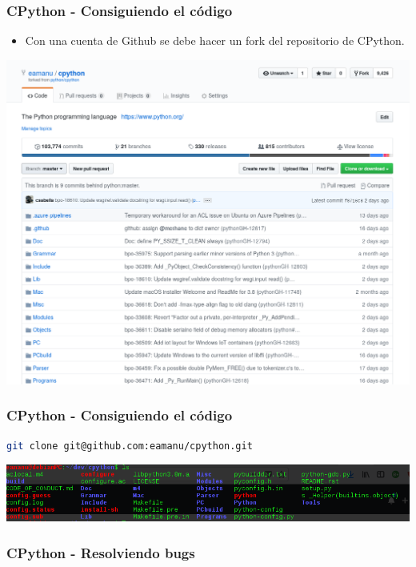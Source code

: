 \documentclass[spanish]{beamer}
\begin{document}
\begin{frame}
	\frametitle{CPython - Consiguiendo el código}
	\begin{itemize}
		\item Con una cuenta de Github se debe hacer un fork del repositorio de CPython.
	\end{itemize}
	\center
	\includegraphics[width=0.8\linewidth]{fork.png}
\end{frame}

\begin{frame}[fragile]
	\frametitle{CPython - Consiguiendo el código}
	\begin{lstlisting}[language=bash]
git clone git@github.com:eamanu/cpython.git
	\end{lstlisting}

	\center
	\includegraphics[width=0.8\linewidth]{clone.png}
\end{frame}

\begin{frame}
	\frametitle{CPython -  Resolviendo bugs}

\end{frame}
\end{document}
